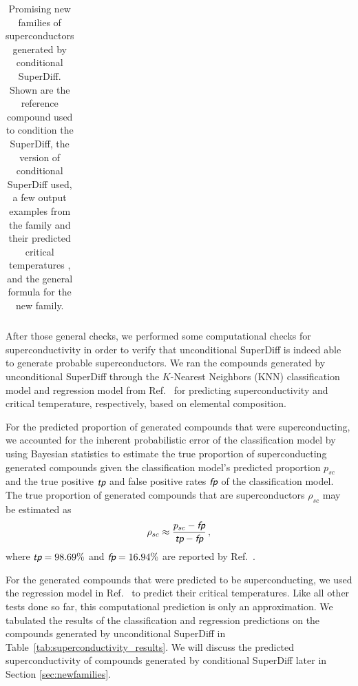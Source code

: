 \documentclass[%
reprint,
 amsmath,amssymb,
 aps,
prb,
]{revtex4-2}
\begin{document}
\begin{table}
\begin{ruledtabular}
\begin{tabular}{lclcl}
    \end{tabular}
    \end{ruledtabular}
    \caption{Promising new families of superconductors generated by conditional SuperDiff. Shown are the reference compound used to condition the SuperDiff, the version of conditional SuperDiff used, a few output examples from the family and their predicted critical temperatures \cite{ROTER20201353689}, and the general formula for the new family.}
    \label{tab:predictions}
\end{table}

After those general checks, we performed some computational checks for superconductivity in order to verify that unconditional SuperDiff is indeed able to generate probable superconductors. We ran the compounds generated by unconditional SuperDiff through the $K$-Nearest Neighbors (KNN) classification model and regression model from Ref.~\cite{ROTER20201353689} for predicting superconductivity and critical temperature, respectively, based on elemental composition.

For the predicted proportion of generated compounds that were superconducting, we accounted for the inherent probabilistic error of the classification model by using Bayesian statistics to estimate the true proportion of superconducting generated compounds given the classification model's predicted proportion $p_{sc}$ and the true positive $\textit{\textsf{tp}}$ and false positive rates $\textit{\textsf{fp}}$ of the classification model. The true proportion of generated compounds that are superconductors $\rho_{sc}$ may be estimated as \cite{Kim_2024}
\begin{equation}\label{eq:estimate}
    \rho_{sc} \approx \frac{p_{sc} - \textit{\textsf{fp}}}{\textit{\textsf{tp}} - \textit{\textsf{fp}}}\, ,
\end{equation}
where $\textit{\textsf{tp}} = 98.69\%$ and $\textit{\textsf{fp}} = 16.94\%$ are reported by Ref.~\cite{ROTER20201353689}.

For the generated compounds that were predicted to be superconducting, we used the regression model in Ref.~\cite{ROTER20201353689} to predict their critical temperatures. Like all other tests done so far, this computational prediction is only an approximation. We tabulated the results of the classification and regression predictions on the compounds generated by unconditional SuperDiff in Table~\ref{tab:superconductivity_results}. We will discuss the predicted superconductivity of compounds generated by conditional SuperDiff later in Section \ref{sec:newfamilies}.
\end{document}
